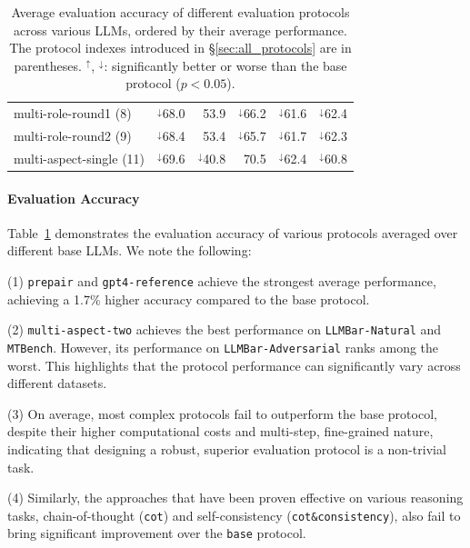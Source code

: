 \documentclass[11pt]{article}
\newcommand{\llmbarnatural}{\texttt{LLMBar-Natural}\xspace}
\newcommand{\adversarial}{\texttt{LLMBar-Adversarial}\xspace}
\newcommand{\mtbench}{\texttt{MTBench}\xspace}
\newcommand{\bettersig}{$^\uparrow$}
\newcommand{\worsesig}{$^\downarrow$}
\begin{document}
\begin{table}[t!]
\begin{tabular}{lrrrrr}
 multi-role-round1 (8)     & \worsesig68.0           & 53.9                    & \worsesig66.2           & \worsesig61.6   & \worsesig62.4           \\
 multi-role-round2 (9)     & \worsesig68.4           & 53.4                    & \worsesig65.7           & \worsesig61.7   & \worsesig62.3           \\
 multi-aspect-single (11)  & \worsesig69.6           & \worsesig40.8           & 70.5                    & \worsesig62.4   & \worsesig60.8           \\
\bottomrule
\end{tabular}
\addtolength{\tabcolsep}{+4.0pt} 
\caption{Average evaluation accuracy of different evaluation protocols across various LLMs, ordered by their average performance.
The protocol indexes introduced in \S\ref{sec:all_protocols} are in parentheses.
\bettersig, \worsesig: significantly better or worse than the base protocol ($p<0.05$).
% 
}
\label{tab:protocol-avg} 
\end{table}


%

\paragraph{Evaluation Accuracy} Table~\ref{tab:protocol-avg} demonstrates the evaluation accuracy of various protocols averaged over different base LLMs.
% 
We note the following:

\noindent (1) \texttt{prepair} and \texttt{gpt4-reference} achieve the strongest average performance, achieving a 1.7\% higher accuracy compared to the base protocol.

\noindent (2) \texttt{multi-aspect-two} achieves the best performance on \llmbarnatural and \mtbench.
However, its performance on \adversarial ranks among the worst.
This highlights that the protocol performance can significantly vary across different datasets.

\noindent (3) On average, most complex protocols fail to outperform the base protocol, despite their higher computational costs and multi-step, fine-grained nature, indicating that designing a robust, superior evaluation protocol is a non-trivial task.


\noindent (4) Similarly, the approaches that have been proven effective on various reasoning tasks, chain-of-thought (\texttt{cot}) and self-consistency (\texttt{cot\&consistency}), also fail to bring significant improvement over the \texttt{base} protocol.
% 
\end{document}
